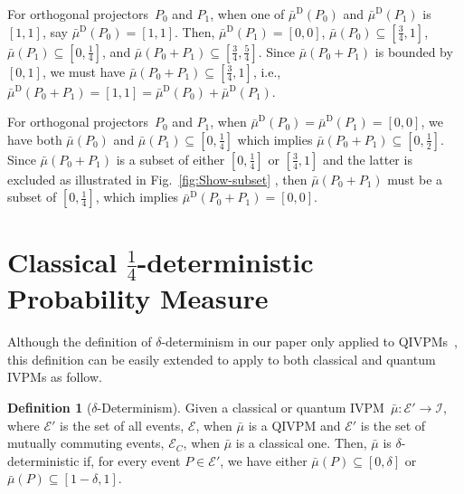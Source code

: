 \documentclass[english,reprint, aps, prl,superscriptaddress, showpacs,
showkeys, longbibliography, amsmath, amssymb, floatfix]{revtex4-1}
\theoremstyle{plain}
\theoremstyle{definition}
\newtheorem{definition}{Definition}
\newcommand{\events}{\ensuremath{\mathcal{E}}}
\newcommand{\imposs}{\ensuremath{\left[0,0\right]}}
\newcommand{\necess}{\ensuremath{\left[1,1\right]}}
\newcommand{\eventsC}{\ensuremath{\events_{C}}}
\begin{document}
For orthogonal projectors~$P_{0}$ and $P_{1}$, when one of $\bar{\mu}^{\textrm{D}}\left(P_{0}\right)$
and $\bar{\mu}^{\textrm{D}}\left(P_{1}\right)$ is $\necess$, say
$\bar{\mu}^{\textrm{D}}\left(P_{0}\right)=\necess$. Then, $\bar{\mu}^{\textrm{D}}\left(P_{1}\right)=\imposs$,
$\bar{\mu}\left(P_{0}\right)\subseteq\left[\frac{3}{4},1\right]$,
$\bar{\mu}\left(P_{1}\right)\subseteq\left[0,\frac{1}{4}\right]$,
and $\bar{\mu}\left(P_{0}+P_{1}\right)\subseteq\left[\frac{3}{4},\frac{5}{4}\right]$.
Since $\bar{\mu}\left(P_{0}+P_{1}\right)$ is bounded by $\left[0,1\right]$,
we must have $\bar{\mu}\left(P_{0}+P_{1}\right)\subseteq\left[\frac{3}{4},1\right]$,
i.e., $\bar{\mu}^{\textrm{D}}\left(P_{0}+P_{1}\right)=\necess=\bar{\mu}^{\textrm{D}}\left(P_{0}\right)+\bar{\mu}^{\textrm{D}}\left(P_{1}\right)$.

For orthogonal projectors~$P_{0}$ and $P_{1}$, when $\bar{\mu}^{\textrm{D}}\left(P_{0}\right)=\bar{\mu}^{\textrm{D}}\left(P_{1}\right)=\imposs$,
we have both $\bar{\mu}\left(P_{0}\right)$ and $\bar{\mu}\left(P_{1}\right)\subseteq\left[0,\frac{1}{4}\right]$
which implies $\bar{\mu}\left(P_{0}+P_{1}\right)\subseteq\left[0,\frac{1}{2}\right]$.
Since $\bar{\mu}\left(P_{0}+P_{1}\right)$ is a subset of either $\left[0,\frac{1}{4}\right]$
or $\left[\tfrac{3}{4},1\right]$ and the latter is excluded as illustrated
in Fig.~\ref{fig:Show-subset} , then $\bar{\mu}\left(P_{0}+P_{1}\right)$
must be a subset of $\left[0,\frac{1}{4}\right]$, which implies $\bar{\mu}^{\textrm{D}}\left(P_{0}+P_{1}\right)=\imposs$.

\section{Classical \texorpdfstring{$\frac{1}{4}$}{¼}-deterministic Probability
Measure}

\label{sec:Classical-=0000BC-deterministic}

Although the definition of $\delta$-determinism in our paper only
applied to QIVPMs~\cite{THOS2017}, this definition can be easily
extended to apply to both classical and quantum IVPMs as follow.

\begin{definition}[$\delta$-Determinism]\label{def:delta-deterministic}
Given a classical or quantum IVPM~$\bar{\mu}:\events'\rightarrow\mathscr{I}$,
where $\events'$ is the set of all events, $\events$, when $\bar{\mu}$
is a QIVPM and $\events'$ is the set of mutually commuting events,
$\eventsC$, when $\bar{\mu}$ is a classical one. Then, $\bar{\mu}$
is $\delta$-deterministic if, for every event $P\in\events'$, we
have either $\bar{\mu}\left(P\right)\subseteq\left[0,\delta\right]$
or $\bar{\mu}\left(P\right)\subseteq\left[1-\delta,1\right]$. \end{definition}
\end{document}
